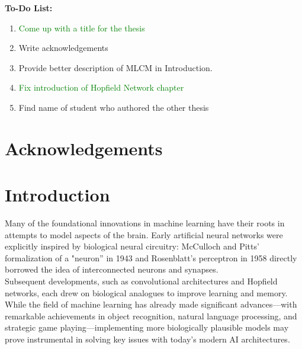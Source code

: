 \documentclass[a4paper,12pt]{report}
\begin{document}

\thispagestyle{empty}
\noindent
\textbf{To-Do List:}
\vspace*{0.5em} \\
\begin{enumerate}
    \item {\textcolor{green}{Come up with a title for the thesis}}
    \item Write acknowledgements
    \item Provide better description of MLCM in Introduction.
    \item {\textcolor{green}{Fix introduction of Hopfield Network chapter}}
    \item Find name of student who authored the other thesis
\end{enumerate}


\thispagestyle{empty}\mbox{}\newpage
\thispagestyle{empty}\mbox{}\newpage
\thispagestyle{empty}
\chapter*{Acknowledgements}

\noindent 
\newpage
\thispagestyle{empty}\mbox{}\newpage

\setcounter{page}{1}

\tableofcontents
\newpage


\chapter*{Introduction}

Many of the foundational innovations in machine learning have their roots in attempts to model aspects 
of the brain. Early artificial neural networks were explicitly inspired by biological neural 
circuitry: McCulloch and Pitts' formalization of a "neuron” in 1943 and Rosenblatt's perceptron in 
1958 directly borrowed the idea of interconnected neurons and synapses. \\
Subsequent developments, such as convolutional architectures and Hopfield networks, each drew on 
biological analogues to improve learning and memory. While the field of machine learning has already 
made significant advances—with remarkable achievements in object recognition, natural language 
processing, and strategic game playing—implementing more biologically plausible models may prove 
instrumental in solving key issues with today's modern AI architectures.
\vspace{0.5em}
\end{document}

